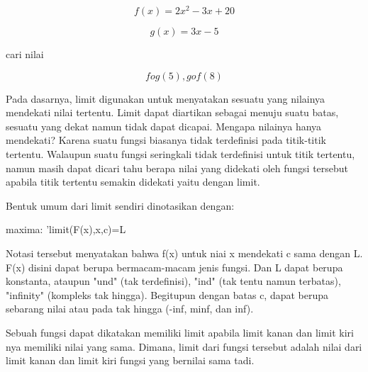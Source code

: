 \documentclass[a4paper,10pt]{article}
\begin{document}
\begin{eulernotebook}
\begin{eulercomment}
\begin{eulercomment}
\begin{eulercomment}
\begin{eulercomment}
\begin{eulercomment}
\begin{eulercomment}
\begin{eulercomment}
\begin{eulercomment}
\begin{eulercomment}
\begin{eulercomment}
\begin{eulercomment}
\begin{eulercomment}
\begin{eulercomment}
\begin{eulercomment}
\begin{eulercomment}
\begin{eulercomment}
\begin{eulercomment}
\end{eulercomment}
\begin{eulerformula}
\[
f(x) = 2x^2-3x+20
\]
\end{eulerformula}
\begin{eulercomment}
\end{eulercomment}
\begin{eulerformula}
\[
g(x)= 3x-5
\]
\end{eulerformula}
\begin{eulercomment}
cari nilai\\
\end{eulercomment}
\begin{eulerformula}
\[
fog(5), gof(8)
\]
\end{eulerformula}
\begin{eulercomment}
\begin{eulercomment}
\begin{eulercomment}
Pada dasarnya, limit digunakan untuk menyatakan sesuatu yang nilainya
mendekati nilai tertentu. Limit dapat diartikan sebagai menuju suatu
batas, sesuatu yang dekat namun tidak dapat dicapai. Mengapa nilainya
hanya mendekati? Karena suatu fungsi biasanya tidak terdefinisi pada
titik-titik tertentu. Walaupun suatu fungsi seringkali tidak
terdefinisi untuk titik tertentu, namun masih dapat dicari tahu berapa
nilai yang didekati oleh fungsi tersebut apabila titik tertentu
semakin didekati yaitu dengan limit.

Bentuk umum dari limit sendiri dinotasikan dengan:

maxima: 'limit(F(x),x,c)=L

Notasi tersebut menyatakan bahwa f(x) untuk niai x mendekati c sama
dengan L. F(x) disini dapat berupa bermacam-macam jenis fungsi. Dan L
dapat berupa konstanta, ataupun "und" (tak terdefinisi), "ind" (tak
tentu namun terbatas), "infinity" (kompleks tak hingga). Begitupun
dengan batas c, dapat berupa sebarang nilai atau pada tak hingga
(-inf, minf, dan inf).

Sebuah fungsi dapat dikatakan memiliki limit apabila limit kanan dan
limit kiri nya memiliki nilai yang sama. Dimana, limit dari fungsi
tersebut adalah nilai dari limit kanan dan limit kiri fungsi yang
bernilai sama tadi.


\end{eulercomment}
\end{eulercomment}
\end{eulercomment}
\end{eulercomment}
\end{eulercomment}
\end{eulercomment}
\end{eulercomment}
\end{eulercomment}
\end{eulercomment}
\end{eulercomment}
\end{eulercomment}
\end{eulercomment}
\end{eulercomment}
\end{eulercomment}
\end{eulercomment}
\end{eulercomment}
\end{eulercomment}
\end{eulercomment}
\end{eulercomment}
\end{eulernotebook}
\end{document}
